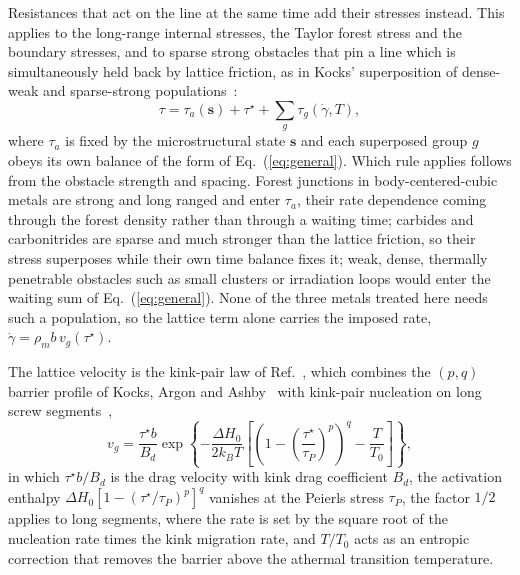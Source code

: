 \documentclass[aps,prl,twocolumn,superscriptaddress,amsmath,amssymb,floatfix]{revtex4-2}
\newcommand{\gd}{\dot\gamma}
\newcommand{\ts}{\tau^{\star}}
\newcommand{\kT}{k_BT}
\begin{document}
Resistances that act on the line at the same time add their stresses instead. This applies to the long-range internal stresses, the Taylor forest stress and the boundary stresses, and to sparse strong obstacles that pin a line which is simultaneously held back by lattice friction, as in Kocks' superposition of dense-weak and sparse-strong populations~\cite{Seeger,KocksArgonAshby}:
\begin{equation}
\tau=\tau_a(\bm s)+\ts+\sum_g\tau_g(\gd,T),
\label{eq:flow}
\end{equation}
where $\tau_a$ is fixed by the microstructural state $\bm s$ and each superposed group $g$ obeys its own balance of the form of Eq.~(\ref{eq:general}). Which rule applies follows from the obstacle strength and spacing. Forest junctions in body-centered-cubic metals are strong and long ranged and enter $\tau_a$, their rate dependence coming through the forest density rather than through a waiting time; carbides and carbonitrides are sparse and much stronger than the lattice friction, so their stress superposes while their own time balance fixes it; weak, dense, thermally penetrable obstacles such as small clusters or irradiation loops would enter the waiting sum of Eq.~(\ref{eq:general}). None of the three metals treated here needs such a population, so the lattice term alone carries the imposed rate, $\gd=\rho_mb\,v_g(\ts)$.

The lattice velocity is the kink-pair law of Ref.~\cite{Po2016}, which combines the $(p,q)$ barrier profile of Kocks, Argon and Ashby~\cite{KocksArgonAshby} with kink-pair nucleation on long screw segments~\cite{DornRajnak1964,HirthLothe},
\begin{equation}
v_g=\frac{\ts b}{B_d}\exp\!\left\{-\frac{\Delta H_0}{2\kT}\left[\left(1-\left(\frac{\ts}{\tau_P}\right)^{p}\right)^{q}-\frac{T}{T_0}\right]\right\},
\label{eq:vg}
\end{equation}
in which $\ts b/B_d$ is the drag velocity with kink drag coefficient $B_d$, the activation enthalpy $\Delta H_0[1-(\ts/\tau_P)^p]^q$ vanishes at the Peierls stress $\tau_P$, the factor $1/2$ applies to long segments, where the rate is set by the square root of the nucleation rate times the kink migration rate, and $T/T_0$ acts as an entropic correction that removes the barrier above the athermal transition temperature.
\end{document}
